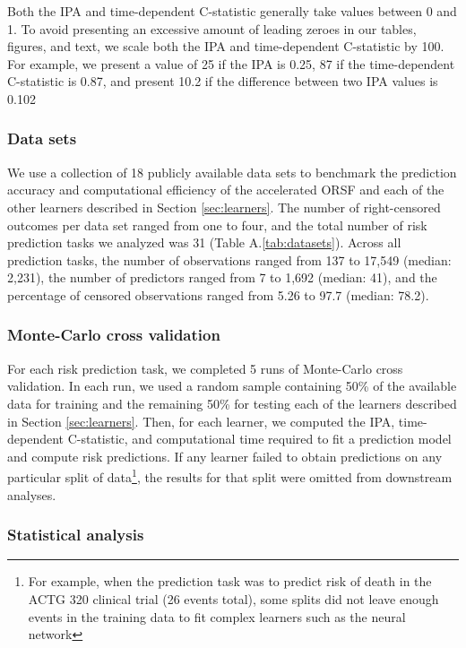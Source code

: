 \documentclass[twoside,11pt]{article}\usepackage[]{graphicx}\usepackage[]{xcolor}
\newcommand{\secref}[1]{Section \ref{#1}}
\newcommand{\tabrefAppendix}[1]{Table A.\ref{#1}}
\begin{document}
Both the IPA and time-dependent C-statistic generally take values between 0 and 1. To avoid presenting an excessive amount of leading zeroes in our tables, figures, and text, we scale both the IPA and time-dependent C-statistic by 100. For example, we present a value of 25 if the IPA is 0.25, 87 if the time-dependent C-statistic is 0.87, and present 10.2 if the difference between two IPA values is 0.102

\subsubsection{Data sets}

We use a collection of 18 publicly available data sets to benchmark the prediction accuracy and computational efficiency of the accelerated ORSF and each of the other learners described in \secref{sec:learners}. The number of right-censored outcomes per data set ranged from one to four, and the total number of risk prediction tasks we analyzed was 31 (\tabrefAppendix{tab:datasets}). Across all prediction tasks, the number of observations ranged from 137 to 17,549 (median: 2,231), the number of predictors ranged from 7 to 1,692 (median: 41), and the percentage of censored observations ranged from 5.26 to 97.7 (median: 78.2).

\subsubsection{Monte-Carlo cross validation}

For each risk prediction task, we completed 5 runs of Monte-Carlo cross validation. In each run, we used a random sample containing 50\% of the available data for training and the remaining 50\% for testing each of the learners described in \secref{sec:learners}. Then, for each learner, we computed the IPA, time-dependent C-statistic, and computational time required to fit a prediction model and compute risk predictions. If any learner failed to obtain predictions on any particular split of data\footnote{For example, when the prediction task was to predict risk of death in the ACTG 320 clinical trial (26 events total), some splits did not leave enough events in the training data to fit complex learners such as the neural network}, the results for that split were omitted from downstream analyses.


\subsubsection{Statistical analysis}
\end{document}
